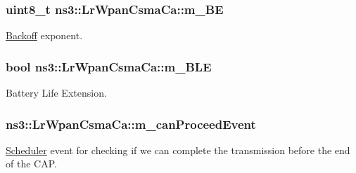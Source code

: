 \subsubsection[{\texorpdfstring{m\+\_\+\+BE}{m_BE}}]{\setlength{\rightskip}{0pt plus 5cm}uint8\+\_\+t ns3\+::\+Lr\+Wpan\+Csma\+Ca\+::m\+\_\+\+BE\hspace{0.3cm}{\ttfamily [private]}}\hypertarget{classns3_1_1LrWpanCsmaCa_a2d88adfd84e36bd42136e97adadb7f9d}{}\label{classns3_1_1LrWpanCsmaCa_a2d88adfd84e36bd42136e97adadb7f9d}
\hyperlink{classns3_1_1Backoff}{Backoff} exponent. 
\subsubsection[{\texorpdfstring{m\+\_\+\+B\+LE}{m_BLE}}]{\setlength{\rightskip}{0pt plus 5cm}bool ns3\+::\+Lr\+Wpan\+Csma\+Ca\+::m\+\_\+\+B\+LE\hspace{0.3cm}{\ttfamily [private]}}\hypertarget{classns3_1_1LrWpanCsmaCa_a679ee6d56f843070ecbe43be539cbd72}{}\label{classns3_1_1LrWpanCsmaCa_a679ee6d56f843070ecbe43be539cbd72}
Battery Life Extension. 
\subsubsection[{\texorpdfstring{m\+\_\+can\+Proceed\+Event}{m_canProceedEvent}}]{ ns3\+::\+Lr\+Wpan\+Csma\+Ca\+::m\+\_\+can\+Proceed\+Event\hspace{0.3cm}{\ttfamily [private]}}\hypertarget{classns3_1_1LrWpanCsmaCa_a3e5ddf3c4614f1046d0e0cee1ecaa6ae}{}\label{classns3_1_1LrWpanCsmaCa_a3e5ddf3c4614f1046d0e0cee1ecaa6ae}
\hyperlink{classns3_1_1Scheduler}{Scheduler} event for checking if we can complete the transmission before the end of the C\+AP. 
